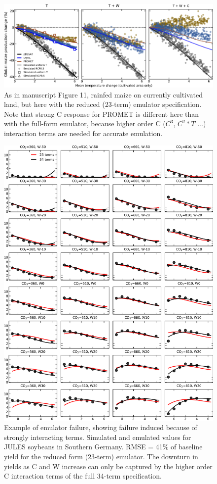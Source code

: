 \documentclass[12pt]{article}
\begin{document}
\begin{figure}[h!]
  \centering
  \includegraphics[width = 16.3cm]{reduced_global_em_maize.png}
  \caption{
  As in manuscript Figure 11, rainfed maize on currently cultivated land, but here with the reduced (23-term) emulator specification. Note that strong C response for PROMET is different here than with the full-form emulator, because higher order C ($C^{3}$, $C^{2} * T$ ...) interaction terms are needed for accurate emulation. 
  }
\end{figure}

\begin{figure}[h!]
  \centering
  \includegraphics[width=14cm]{JULES_soy_bad.png}
  \caption{
  Example of emulator failure, showing failure induced because of strongly interacting terms. 
  Simulated and emulated values for JULES soybeans in Southern Germany. RMSE = 41\% of baseline yield for the reduced form (23-term) emulator.
  The downturn in yields as C and W increase can only be captured by the higher order C interaction terms of the full 34-term specification. 
  }
  \label{fig:lpjmlrice}
\end{figure}
\end{document}

